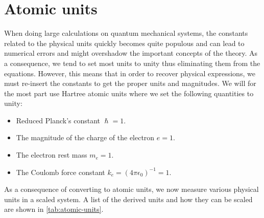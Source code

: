     \section{Atomic units}
        When doing large calculations on quantum mechanical systems, the
        constants related to the physical units quickly becomes quite populous
        and can lead to numerical errors and might overshadow the important
        concepts of the theory.
        As a consequence, we tend to set most units to unity thus eliminating
        them from the equations.
        However, this means that in order to recover physical expressions, we
        must re-insert the constants to get the proper units and magnitudes.
        We will for the most part use Hartree atomic units \cite{hartree_1928}
        where we set the following quantities to unity:
        \begin{itemize}
            \item Reduced Planck's constant $\hslash = 1$.
            \item The magnitude of the charge of the electron
                $e = 1$.
            \item The electron rest mass $m_e = 1$.
            \item The Coulomb force constant
                $k_e = (4\pi \epsilon_0)^{-1} = 1$.
        \end{itemize}
        As a consequence of converting to atomic units, we now measure various
        physical units in a scaled system.
        A list of the derived units and how they can be scaled are shown in
        \autoref{tab:atomic-units}.

